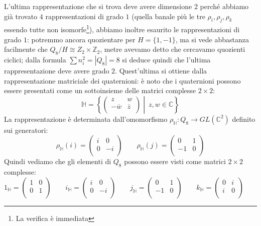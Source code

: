 \documentclass[11pt]{article}
\theoremstyle{plain}
\theoremstyle{definition}
\theoremstyle{remark}
\newcommand{\C}{\mathbb{C}}
\newcommand{\Z}{\mathbb{Z}}
\newcommand{\HH}{\mathbb{H}}
\begin{document}
L'ultima rappresentazione che si trova deve avere dimensione $2$ perché abbiamo già trovato $4$ rappresentazioni di grado $1$ (quella banale più le tre $\rho_i, \rho_j, \rho_k$ essendo tutte non isomorfe\footnote{La verifica è immediata}), abbiamo inoltre esaurito le rappresentazioni di grado $1$: potremmo ancora quozientare per $H=\{ 1, -1 \}$, ma si vede abbastanza facilmente che $Q_8/H\cong Z_2\times\Z_2$, metre avevamo detto che cercavamo quozienti ciclici; dalla formula $\sum n_i^2=|Q_8| = 8$ si deduce quindi che l'ultima rappresentazione deve avere grado $2$. Quest'ultima si ottiene dalla rappresentazione matriciale dei quaternioni: è noto che i quaternioni possono essere presentati come un sottoinsieme delle matrici complesse $2\times 2$:
\[
	\HH = \left\{
		\begin{pmatrix}
	              	z & w\\
	              	-\overline{w} & \overline{z}\\
	              \end{pmatrix}
	              \middle|\ z,w\in \C
		\right\}
\]
La rappresentazione è determinata dall'omomorfismo $\rho_{\HH}:Q_8\to GL(\C^2)$ definito sui generatori:
\[
	\rho_{\HH}(i) = \begin{pmatrix}
	          	i & 0\\
	          	0 & -i\\
	          \end{pmatrix}
	\qquad
	\rho_{\HH}(j) = \begin{pmatrix}
	          	0 & 1\\
	          	-1& 0\\
	          \end{pmatrix}
\]
Quindi vediamo che gli elementi di $Q_8$ possono essere visti come matrici $2\times2$ complesse:
\[
1_\HH =
\left(
\begin{array}{cc}
1 & 0 \\
0 & 1 \\
\end{array}
\right)
\qquad
i_\HH =
\left(
\begin{array}{cc}
i & 0 \\
0 & -i \\
\end{array}
\right)
\qquad
j_\HH =
\left(
\begin{array}{cc}
0 & 1 \\
-1 & 0 \\
\end{array}
\right)
\qquad
k_\HH =
\left(
\begin{array}{cc}
0 & i \\
i & 0 \\
\end{array}
\right)
\qquad
\]
\end{document}
